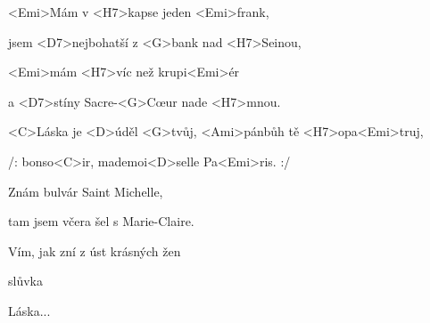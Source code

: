 

\zs
<Emi>Mám v <H7>kapse jeden <Emi>frank,

jsem <D7>nejbohatší z <G>bank nad <H7>Seinou,

<Emi>mám <H7>víc než krupi<Emi>ér

a <D7>stíny Sacre-<G>Cœur nade <H7>mnou.
\ks

\zr
<C>Láska je <D>úděl <G>tvůj, <Ami>pánbůh tě <H7>opa<Emi>truj,

/: bonso<C>ir, mademoi<D>selle Pa<Emi>ris. :/
\kr

\zs
Znám bulvár Saint Michelle,

tam jsem včera šel s Marie-Claire.

Vím, jak zní z úst krásných žen

slůvka 
\ks

\zr
Láska...
\kr

\kp
